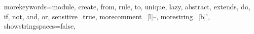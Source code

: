 {morekeywords={module, create, from, rule, to, unique, lazy, abstract, extends, do, if, not, and, or},
sensitive=true,
morecomment=[l]{--},
morestring=[b]',
showstringspaces=false,
}